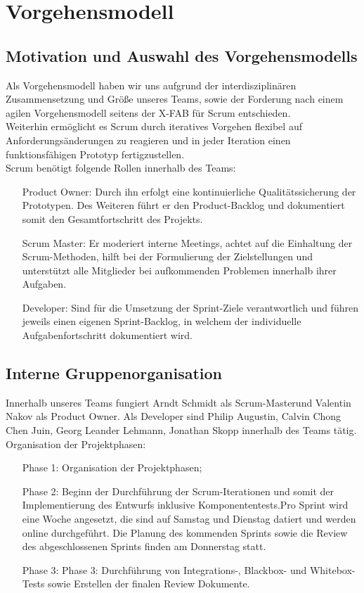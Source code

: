 \chapter{Vorgehensmodell}
\section{Motivation und Auswahl des Vorgehensmodells}

Als Vorgehensmodell haben wir uns aufgrund der interdisziplinären Zusammensetzung und Größe unseres Teams, sowie der Forderung nach einem agilen Vorgehensmodell seitens der X-FAB für Scrum entschieden.\\
Weiterhin ermöglicht es Scrum durch iteratives Vorgehen flexibel auf Anforderungsänderungen zu reagieren und in jeder Iteration einen funktionsfähigen Prototyp fertigzustellen.\\

Scrum benötigt folgende Rollen innerhalb des Teams:
\begin{itemize}
	\item[Product Owner:] Durch ihn erfolgt eine kontinuierliche Qualitätssicherung der Prototypen. Des Weiteren führt er den Product-Backlog und dokumentiert somit den Gesamtfortschritt des Projekts.

	\item[Scrum Master:] Er moderiert interne Meetings, achtet auf die Einhaltung der Scrum-Methoden, hilft bei der Formulierung der Zielstellungen und unterstützt alle Mitglieder bei aufkommenden Problemen innerhalb ihrer Aufgaben.
	
	\item[Developer:]
	Sind für die Umsetzung der Sprint-Ziele verantwortlich und führen jeweils einen eigenen Sprint-Backlog, in welchem der individuelle Aufgabenfortschritt dokumentiert wird.
	
\end{itemize}

\section{Interne Gruppenorganisation}
Innerhalb unseres Teams fungiert Arndt Schmidt als Scrum-Masterund Valentin Nakov als Product Owner. Als Developer sind Philip Augustin, Calvin Chong Chen Juin, Georg Leander Lehmann, Jonathan Skopp innerhalb des Teams tätig.\\

Organisation der Projektphasen:
\begin{itemize}
	\item[Phase 1:] Organisation der Projektphasen;
	\item[Phase 2:] Beginn der Durchführung der Scrum-Iterationen und somit der Implementierung des Entwurfs inklusive Komponententests.Pro Sprint wird eine Woche angesetzt, die  sind auf Samstag und Dienstag datiert und werden online durchgeführt. Die Planung des kommenden Sprints sowie die Review des abgeschlossenen Sprints finden am Donnerstag statt.
	\item[Phase 3:] Phase 3: Durchführung von Integrations-, Blackbox- und Whitebox- Tests sowie Erstellen der finalen Review Dokumente.
	
	
\end{itemize}
\clearpage
